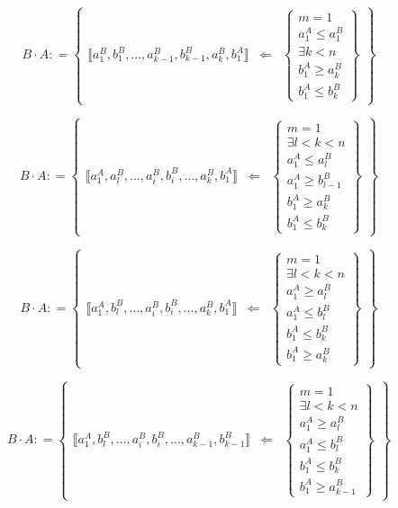 \documentclass[
]{article}
\begin{document}
\begin{enumerate}
  \[{{B \cdot A}{: =}}\begin{Bmatrix}
  {⟦{{a_{1}^{B},b_{1}^{B}},\ldots,{a_{k - 1}^{B},b_{k - 1}^{B}},{a_{k}^{B},b_{1}^{A}}}⟧} & \Leftarrow & \begin{Bmatrix}
  {m = 1} \\
  {a_{1}^{A} \leq a_{1}^{B}} \\
  {\exists{k < n}} \\
  {b_{1}^{A} \geq a_{k}^{B}} \\
  {b_{1}^{A} \leq b_{k}^{B}}
  \end{Bmatrix}
  \end{Bmatrix}\]

  \[{{B \cdot A}{: =}}\begin{Bmatrix}
  {⟦{{a_{1}^{A},a_{l}^{B}},\ldots,{a_{i}^{B},b_{i}^{B}},\ldots,{a_{k}^{B},b_{1}^{A}}}⟧} & \Leftarrow & \begin{Bmatrix}
  {m = 1} \\
  {\exists{{l < k} < n}} \\
  {a_{1}^{A} \leq a_{l}^{B}} \\
  {a_{1}^{A} \geq b_{l - 1}^{B}} \\
  {b_{1}^{A} \geq a_{k}^{B}} \\
  {b_{1}^{A} \leq b_{k}^{B}}
  \end{Bmatrix}
  \end{Bmatrix}\]

  \[{{B \cdot A}{: =}}\begin{Bmatrix}
  {⟦{{a_{1}^{A},b_{l}^{B}},\ldots,{a_{i}^{B},b_{i}^{B}},\ldots,{a_{k}^{B},b_{1}^{A}}}⟧} & \Leftarrow & \begin{Bmatrix}
  {m = 1} \\
  {\exists{{l < k} < n}} \\
  {a_{1}^{A} \geq a_{l}^{B}} \\
  {a_{1}^{A} \leq b_{l}^{B}} \\
  {b_{1}^{A} \leq b_{k}^{B}} \\
  {b_{1}^{A} \geq a_{k}^{B}}
  \end{Bmatrix}
  \end{Bmatrix}\]

  \[{{B \cdot A}{: =}}\begin{Bmatrix}
  {⟦{{a_{1}^{A},b_{l}^{B}},\ldots,{a_{i}^{B},b_{i}^{B}},\ldots,{a_{k - 1}^{B},b_{k - 1}^{B}}}⟧} & \Leftarrow & \begin{Bmatrix}
  {m = 1} \\
  {\exists{{l < k} < n}} \\
  {a_{1}^{A} \geq a_{l}^{B}} \\
  {a_{1}^{A} \leq b_{l}^{B}} \\
  {b_{1}^{A} \leq b_{k}^{B}} \\
  {b_{1}^{A} \geq a_{k - 1}^{B}}
  \end{Bmatrix}
  \end{Bmatrix}\]


\end{enumerate}
\end{document}
